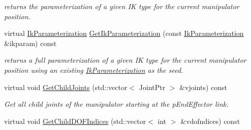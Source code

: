 \begin{DoxyCompactItemize}
\begin{DoxyCompactList}\small\item\em returns the parameterization of a given IK type for the current manipulator position. \item\end{DoxyCompactList}\item 
virtual \hyperlink{classOpenRAVE_1_1IkParameterization}{IkParameterization} \hyperlink{classOpenRAVE_1_1RobotBase_1_1Manipulator_ae88cd3fc2bd2b4da5ea6b84ed9edc6b9}{GetIkParameterization} (const \hyperlink{classOpenRAVE_1_1IkParameterization}{IkParameterization} \&ikparam) const 
\begin{DoxyCompactList}\small\item\em returns a full parameterization of a given IK type for the current manipulator position using an existing \hyperlink{classOpenRAVE_1_1IkParameterization}{IkParameterization} as the seed. \item\end{DoxyCompactList}\item 
\hypertarget{classOpenRAVE_1_1RobotBase_1_1Manipulator_a814285268af782cfac89350db77df299}{
virtual void \hyperlink{classOpenRAVE_1_1RobotBase_1_1Manipulator_a814285268af782cfac89350db77df299}{GetChildJoints} (std::vector$<$ JointPtr $>$ \&vjoints) const }
\label{classOpenRAVE_1_1RobotBase_1_1Manipulator_a814285268af782cfac89350db77df299}

\begin{DoxyCompactList}\small\item\em Get all child joints of the manipulator starting at the pEndEffector link. \item\end{DoxyCompactList}\item 
\hypertarget{classOpenRAVE_1_1RobotBase_1_1Manipulator_ae7d4690b82988f471033acbd0bb460ae}{
virtual void \hyperlink{classOpenRAVE_1_1RobotBase_1_1Manipulator_ae7d4690b82988f471033acbd0bb460ae}{GetChildDOFIndices} (std::vector$<$ int $>$ \&vdofndices) const }
\label{classOpenRAVE_1_1RobotBase_1_1Manipulator_ae7d4690b82988f471033acbd0bb460ae}


\end{DoxyCompactItemize}
